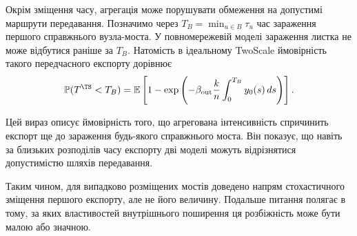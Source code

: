 Окрім зміщення часу, агрегація може порушувати обмеження на допустимі маршрути передавання. Позначимо через
$T_B=\min_{u\in B}\tau_u$ час зараження першого справжнього вузла-моста. У повномережевій моделі зараження листка не може відбутися раніше за $T_B$. Натомість в ідеальному TwoScale ймовірність такого передчасного експорту дорівнює
\begin{equation}
\label{eq:bypass}
\mathbb{P}(T^{\TS}<T_B)
=
\mathbb{E}\left[
1-\exp\left(
-\beta_{\mathrm{out}}\frac{k}{n}
\int_0^{T_B}y_0(s)\,ds
\right)
\right].
\end{equation}

Цей вираз описує ймовірність того, що агрегована інтенсивність спричинить експорт ще до зараження будь-якого справжнього моста. Він показує, що навіть за близьких розподілів часу експорту дві моделі можуть відрізнятися допустимістю шляхів передавання.

Таким чином, для випадково розміщених мостів доведено напрям стохастичного зміщення першого експорту, але не його величину. Подальше питання полягає в тому, за яких властивостей внутрішнього поширення ця розбіжність може бути малою або значною.






